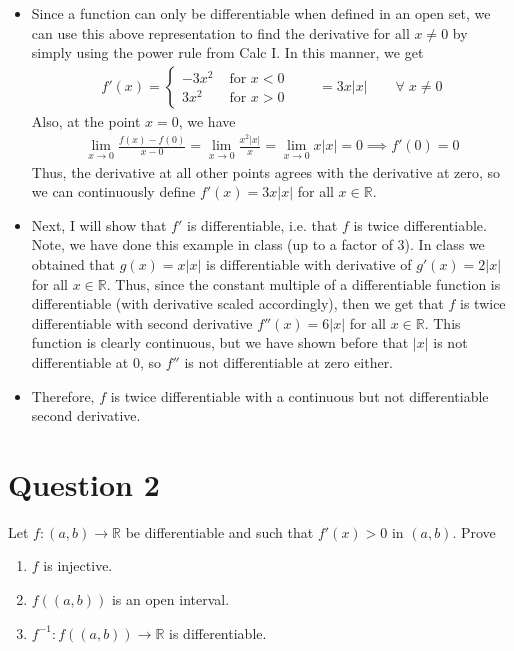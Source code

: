\documentclass[10pt,a4paper]{article}
\theoremstyle{definition}
\theoremstyle{definition}
\numberwithin{equation}{section}
\begin{document}
\begin{enumerate}[label = (\alph*)]
\begin{itemize}
	\item Since a function can only be differentiable when defined in an open set, we can use this above representation to find the derivative for all $x \neq 0$ by simply using the power rule from Calc I. In this manner, we get
	\begin{align*}
	f'(x) = \begin{cases}
	-3x^2 &\text{ for } x < 0\\
	3x^2 &\text{ for } x > 0
	\end{cases} \qquad = 3x|x| \qquad \forall \; x \neq 0
	\end{align*}
	Also, at the point $x = 0$, we have
	\begin{align*}
	\lim_{x \to 0} \frac{f(x) - f(0)}{x - 0} = \lim_{x \to 0} \frac{x^2|x|}{x} = \lim_{x \to 0} x|x| = 0 \implies f'(0) = 0
	\end{align*}
	Thus, the derivative at all other points agrees with the derivative at zero, so we can continuously define $f'(x) = 3x|x|$ for all $x \in \mathbb{R}$. 
	\item Next, I will show that $f'$ is differentiable, i.e. that $f$ is twice differentiable. Note, we have done this example in class (up to a factor of 3). In class we obtained that $g(x) = x|x|$ is differentiable with derivative of $g'(x) = 2|x|$ for all $x \in \mathbb{R}$. Thus, since the constant multiple of a differentiable function is differentiable (with derivative scaled accordingly), then we get that $f$ is twice differentiable with second derivative $f''(x) = 6|x|$ for all $x \in \mathbb{R}$. This function is clearly continuous, but we have shown before that $|x|$ is not differentiable at 0, so $f''$ is not differentiable at zero either. 
	\item Therefore, $f$ is twice differentiable with a continuous but not differentiable second derivative.  
	\end{itemize}
\end{enumerate}

\section*{Question 2}
Let $f: (a, b) \to \mathbb{R}$ be differentiable and such that $f'(x) > 0$ in $(a, b)$. Prove
\begin{enumerate}[label = (\alph*)]
\item $f$ is injective. 
\item $f((a, b))$ is an open interval.
\item $f^{-1}: f((a, b)) \to \mathbb{R}$ is differentiable.
\end{enumerate}
\end{document}
